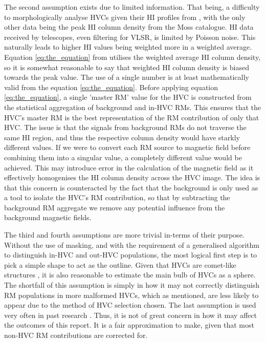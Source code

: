 The second assumption exists due to limited information. That being, a difficulty to morphologically analyse HVCs given their HI profiles from \cite{ID6}, with the only other data being the peak HI column density from the Moss catalogue. HI data received by telescopes, even filtering for VLSR, is limited by Poisson noise. This naturally leads to higher HI values being weighted more in a weighted average. Equation \ref{eq:the_equation} from \cite{ID27} utilises the weighted average HI column density, so it is somewhat reasonable to say that weighted HI column density is biased towards the peak value. The use of a single number is at least mathematically valid from the equation \ref{eq:the_equation}. Before applying equation \ref{eq:the_equation}, a single 'master RM' value for the HVC is constructed from the statistical aggregation of background and in-HVC RMs. This ensures that the HVC's master RM is the best representation of the RM contribution of only that HVC. The issue is that the signals from background RMs do not traverse the same HI region, and thus the respective column density would have starkly different values. If we were to convert each RM source to magnetic field before combining them into a singular value, a completely different value would be achieved. This may introduce error in the calculation of the magnetic field as it effectively homogenises the HI column density across the HVC image. The idea is that this concern is counteracted by the fact that the background is only used as a tool to isolate the HVC's RM contribution, so that by subtracting the background RM aggregate we remove any potential influence from the background magnetic fields. 



The third and fourth assumptions are more trivial in-terms of their purpose. Without the use of masking, and with the requirement of a generalised algorithm to distinguish in-HVC and out-HVC populations, the most logical first step is to pick a simple shape to act as the outline. Given that HVCs are comet-like structures \citep{ID13}, it is also reasonable to estimate the main bulb of HVCs as a sphere. The shortfall of this assumption is simply in how it may not correctly distinguish RM populations in more malformed HVCs, which as mentioned, are less likely to appear due to the method of HVC selection chosen. The last assumption is used very often in past research \citep{ID27,ID3, ID26, ID5}. Thus, it is not of great concern in how it may affect the outcomes of this report. It is a fair approximation to make, given that most non-HVC RM contributions are corrected for.


